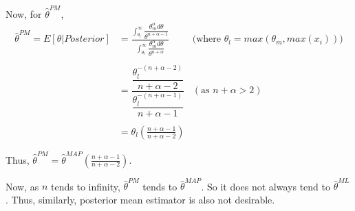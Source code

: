 \documentclass[12pt]{article}
\begin{document}
\begin{enumerate}
	Now, for $\hat{\theta}^{PM}$,
	\begin{align}
		\hat{\theta}^{PM} = E[\theta | Posterior] &= \frac{\displaystyle \int_{\theta_l}^{\infty} \dfrac{\theta_m^\alpha d\theta}{\theta^{n+\alpha-1}} }{\displaystyle \int_{\theta_l}^{\infty} \dfrac{\theta_m^\alpha d\theta}{\theta^{n+\alpha}}} & \text{(where } \theta_l = max(\theta_m, max(x_i)) \text{)}\\ \nonumber \\
		&= \dfrac{\dfrac{\theta_l^{-(n+\alpha-2)}}{n+\alpha-2}}{\dfrac{\theta_l^{-(n+\alpha-1)}}{n+\alpha-1}} & (\text{as } n + \alpha > 2) \\ \nonumber \\
		&= \theta_l(\frac{n+\alpha-1}{n+\alpha-2}) 
	\end{align}
	
	Thus, $\hat{\theta}^{PM} = \hat{\theta}^{MAP}(\frac{n+\alpha-1}{n+\alpha-2})$.
	
	Now, as $n$ tends to infinity, $\hat{\theta}^{PM}$ tends to $\hat{\theta}^{MAP}$. So it does not always tend to $\hat{\theta}^{ML}$. Thus, similarly, posterior mean estimator is also not desirable. 
	
	 
	
\end{enumerate}
\end{document}
